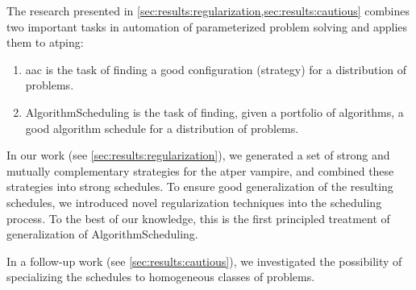 The research presented in \cref{sec:results:regularization,sec:results:cautious} combines two important tasks in automation of parameterized problem solving and applies them to \gls{atping}:
\begin{enumerate}
\item \Gls{aac} is the task of finding a good configuration (strategy) for a distribution of problems.
\item \Gls{AlgorithmScheduling} is the task of finding, given a portfolio of algorithms, a good algorithm schedule for a distribution of problems.
\end{enumerate}
In our work \cite{DBLP:conf/ijcar/BartekCS24} (see \cref{sec:results:regularization}), we generated a set of strong and mutually complementary strategies for the \gls{atper} \gls{vampire},
and combined these strategies into strong schedules.
To ensure good generalization of the resulting schedules,
we introduced novel regularization techniques into the scheduling process.
To the best of our knowledge, this is the first principled treatment of generalization of \gls{AlgorithmScheduling}.

In a follow-up work \cite{DBLP:conf/paar/BartekC024} (see \cref{sec:results:cautious}), we investigated the possibility of specializing the schedules to homogeneous classes of problems.

